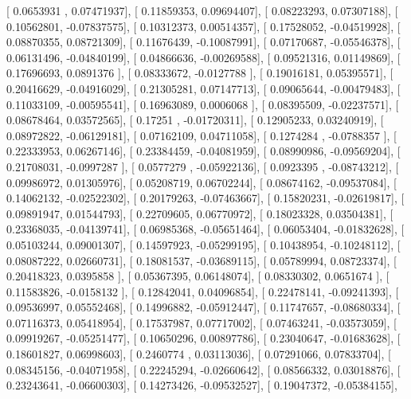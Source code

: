 \documentclass{article}
\begin{document}
       [ 0.0653931 ,  0.07471937],
       [ 0.11859353,  0.09694407],
       [ 0.08223293,  0.07307188],
       [ 0.10562801, -0.07837575],
       [ 0.10312373,  0.00514357],
       [ 0.17528052, -0.04519928],
       [ 0.08870355,  0.08721309],
       [ 0.11676439, -0.10087991],
       [ 0.07170687, -0.05546378],
       [ 0.06131496, -0.04840199],
       [ 0.04866636, -0.00269588],
       [ 0.09521316,  0.01149869],
       [ 0.17696693,  0.0891376 ],
       [ 0.08333672, -0.0127788 ],
       [ 0.19016181,  0.05395571],
       [ 0.20416629, -0.04916029],
       [ 0.21305281,  0.07147713],
       [ 0.09065644, -0.00479483],
       [ 0.11033109, -0.00595541],
       [ 0.16963089,  0.0006068 ],
       [ 0.08395509, -0.02237571],
       [ 0.08678464,  0.03572565],
       [ 0.17251   , -0.01720311],
       [ 0.12905233,  0.03240919],
       [ 0.08972822, -0.06129181],
       [ 0.07162109,  0.04711058],
       [ 0.1274284 , -0.0788357 ],
       [ 0.22333953,  0.06267146],
       [ 0.23384459, -0.04081959],
       [ 0.08990986, -0.09569204],
       [ 0.21708031, -0.0997287 ],
       [ 0.0577279 , -0.05922136],
       [ 0.0923395 , -0.08743212],
       [ 0.09986972,  0.01305976],
       [ 0.05208719,  0.06702244],
       [ 0.08674162, -0.09537084],
       [ 0.14062132, -0.02522302],
       [ 0.20179263, -0.07463667],
       [ 0.15820231, -0.02619817],
       [ 0.09891947,  0.01544793],
       [ 0.22709605,  0.06770972],
       [ 0.18023328,  0.03504381],
       [ 0.23368035, -0.04139741],
       [ 0.06985368, -0.05651464],
       [ 0.06053404, -0.01832628],
       [ 0.05103244,  0.09001307],
       [ 0.14597923, -0.05299195],
       [ 0.10438954, -0.10248112],
       [ 0.08087222,  0.02660731],
       [ 0.18081537, -0.03689115],
       [ 0.05789994,  0.08723374],
       [ 0.20418323,  0.0395858 ],
       [ 0.05367395,  0.06148074],
       [ 0.08330302,  0.0651674 ],
       [ 0.11583826, -0.0158132 ],
       [ 0.12842041,  0.04096854],
       [ 0.22478141, -0.09241393],
       [ 0.09536997,  0.05552468],
       [ 0.14996882, -0.05912447],
       [ 0.11747657, -0.08680334],
       [ 0.07116373,  0.05418954],
       [ 0.17537987,  0.07717002],
       [ 0.07463241, -0.03573059],
       [ 0.09919267, -0.05251477],
       [ 0.10650296,  0.00897786],
       [ 0.23040647, -0.01683628],
       [ 0.18601827,  0.06998603],
       [ 0.2460774 ,  0.03113036],
       [ 0.07291066,  0.07833704],
       [ 0.08345156, -0.04071958],
       [ 0.22245294, -0.02660642],
       [ 0.08566332,  0.03018876],
       [ 0.23243641, -0.06600303],
       [ 0.14273426, -0.09532527],
       [ 0.19047372, -0.05384155],
\end{document}
